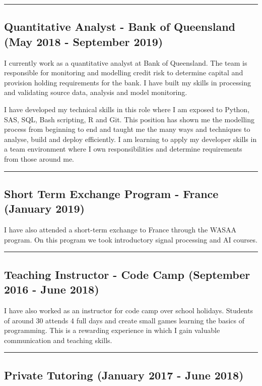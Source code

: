 \noindent\rule{\textwidth}{0.5pt}

\subsection*{Quantitative Analyst - Bank of Queensland (May 2018 - September 2019)}
I currently work as a quantitative analyst at Bank of Queensland. The team is responsible for monitoring and modelling credit risk to determine capital and provision holding requirements for the bank. I have built my skills in processing and validating source data, analysis and model monitoring. 

I have developed my technical skills in this role where I am exposed to Python, SAS, SQL, Bash scripting, R and Git. This position has shown me the modelling process from beginning to end and taught me the many ways and techniques to analyse, build and deploy efficiently. I am learning to apply my developer skills in a team environment where I own responsibilities and determine requirements from those around me. 

\noindent\rule{\textwidth}{0.5pt}

\subsection*{Short Term Exchange Program - France (January 2019)}

I have also attended a short-term exchange to France through the WASAA program. On this program we took introductory signal processing and AI courses.  

\noindent\rule{\textwidth}{0.5pt}

\subsection*{Teaching Instructor - Code Camp (September 2016 - June 2018)}
I have also worked as an instructor for code camp over school holidays. Students of around 30 attends 4 full days and create small games learning the basics of programming. This is a rewarding experience in which I gain valuable communication and teaching skills. 

\noindent\rule{\textwidth}{0.5pt}

\subsection*{Private Tutoring (January 2017 - June 2018)}

